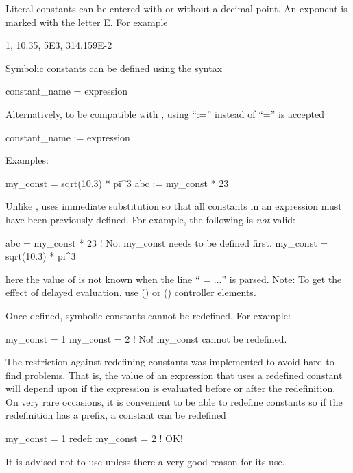 {{{{{
Literal constants can be entered with or without a decimal point. An
exponent is marked with the letter E. For example
\begin{example}
  1, 10.35, 5E3, 314.159E-2
\end{example}
Symbolic constants can be defined using the syntax
\begin{example}
  constant_name = expression
\end{example}
Alternatively, to be compatible with \mad, using ``:='' instead of ``='' is accepted
\begin{example}
  constant_name := expression
\end{example}
Examples:
\begin{example}
  my_const = sqrt(10.3) * pi^3
  abc     := my_const * 23
\end{example}
Unlike \mad, \bmad uses immediate substitution so that all constants in an expression must have been
previously defined. For example, the following is {\em not} valid:
\begin{example}
  abc      = my_const * 23      ! No: my_const needs to be defined first.
  my_const = sqrt(10.3) * pi^3
\end{example}
here the value of  is not known when the line `` = $\ldots$'' is parsed. Note:
To get the effect of delayed evaluation, use  () or 
() controller elements.

Once defined, symbolic constants cannot be redefined. For example:
\begin{example}
  my_const = 1
  my_const = 2  ! No! my_const cannot be redefined.
\end{example}
The restriction against redefining constants was implemented to avoid hard to find problems.
That is, the value of an expression that uses a redefined constant will depend upon if the expression 
is evaluated before or after the redefinition.
On very rare occasions, it is convenient to be able to redefine constants so if the redefinition
has a  prefix, a constant can be redefined
\begin{example}
  my_const = 1
  redef: my_const = 2  ! OK!
\end{example}
It is advised not to use  unless there a very good reason for its use.

}}}}}
